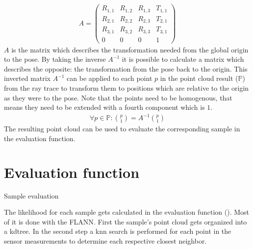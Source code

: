 \documentclass[Thesis.tex]{subfiles}
\begin{document}
\begin{align}
A = \left(\begin{array}{cccc}
      R_{1,1} & R_{1,2} & R_{1,3} & T_{1,1} \\ 
      R_{2,1} & R_{2,2} & R_{2,3} & T_{2,1} \\ 
      R_{3,1} & R_{3,2} & R_{3,3} & T_{3,1} \\
         0    &    0    &    0    &    1
    \end{array}\right)\label{form:affinetransmatrix}
\end{align}
$A$ is the matrix which describes the transformation needed from the global origin to the pose. By taking the inverse $A^{-1}$ it is possible to calculate a matrix which describes the opposite: the transformation from the pose back to the origin. This inverted matrix $A^{-1}$ can be applied to each point $p$ in the point cloud result ($\mathbb{P}$) from the ray trace to transform them to positions which are relative to the origin as they were to the pose. Note that the points need to be homogenous, that means they need to be extended with a fourth component which is $1$.
%
\begin{align}
  \forall p \in \mathbb{P}: \genfrac{(}{)}{0pt}{0}{p}{1} = A^{-1} \genfrac{(}{)}{0pt}{0}{p}{1}\label{form:transformpoint}
\end{align}
%
The resulting point cloud can be used to evaluate the corresponding sample in the evaluation function.
%
%
%
\section{Evaluation function}
%
\begin{algorithm}[!htp]
\caption{Sample evaluation}
\label{alg:eval}

\end{algorithm}
The likelihood for each sample gets calculated in the evaluation function (). Most of it is done with the \gls{FLANN}. First the sample's point cloud gets organized into a \gls{kdtree}. In the second step a \gls{knn} search is performed for each point in the sensor measurements to determine each respective closest neighbor. 
\end{document}
